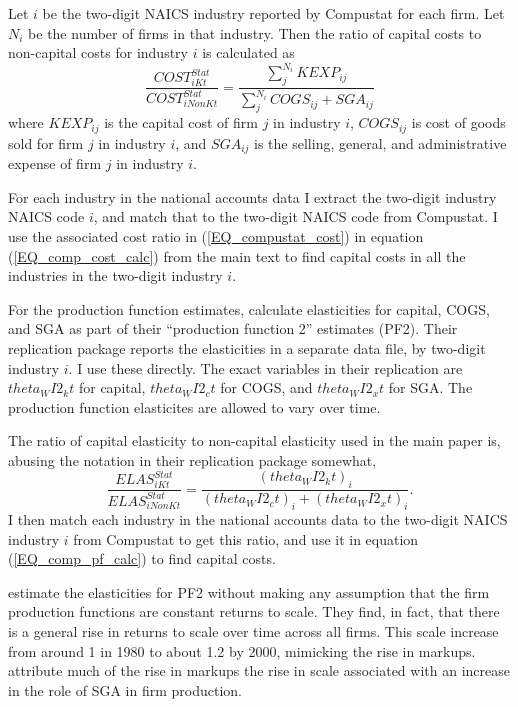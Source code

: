\documentclass[11pt]{article}
\begin{document}
Let $i$ be the two-digit NAICS industry reported by Compustat for each firm. Let $N_i$ be the number of firms in that industry. Then the ratio of capital costs to non-capital costs for industry $i$ is calculated as
\begin{equation}
	\frac{COST^{Stat}_{iKt}}{COST^{Stat}_{iNonKt}} = \frac{\sum_{j}^{N_i} KEXP_{ij}}{\sum_{j}^{N_i} COGS_{ij} + SGA_{ij}} \label{EQ_compustat_cost}
\end{equation}
where $KEXP_{ij}$ is the capital cost of firm $j$ in industry $i$, $COGS_{ij}$ is cost of goods sold for firm $j$ in industry $i$, and $SGA_{ij}$ is the selling, general, and administrative expense of firm $j$ in industry $i$. 

For each industry in the national accounts data I extract the two-digit industry NAICS code $i$, and match that to the two-digit NAICS code from Compustat. I use the associated cost ratio in (\ref{EQ_compustat_cost}) in equation (\ref{EQ_comp_cost_calc}) from the main text to find capital costs in all the industries in the two-digit industry $i$. 

For the production function estimates, \cite{dleu2020} calculate elasticities for capital, COGS, and SGA as part of their ``production function 2'' estimates (PF2). Their replication package reports the elasticities in a separate data file, by two-digit industry $i$. I use these directly. The exact variables in their replication are $theta_WI2_kt$ for capital, $theta_WI2_ct$ for COGS, and $theta_WI2_xt$ for SGA. The production function elasticites are allowed to vary over time. 

The ratio of capital elasticity to non-capital elasticity used in the main paper is, abusing the notation in their replication package somewhat, 
\begin{equation}
	\frac{ELAS^{Stat}_{iKt}}{ELAS^{Stat}_{iNonKt}} = \frac{(theta_WI2_kt)_i}{(theta_WI2_ct)_i+(theta_WI2_xt)_i}.
\end{equation}
I then match each industry in the national accounts data to the two-digit NAICS industry $i$ from Compustat to get this ratio, and use it in equation (\ref{EQ_comp_pf_calc}) to find capital costs. 

\cite{dleu2020} estimate the elasticities for PF2 without making any assumption that the firm production functions are constant returns to scale. They find, in fact, that there is a general rise in returns to scale over time across all firms. This scale increase from around 1 in 1980 to about 1.2 by 2000, mimicking the rise in markups. \cite{dleu2020} attribute much of the rise in markups the rise in scale associated with an increase in the role of SGA in firm production. 
\end{document}
